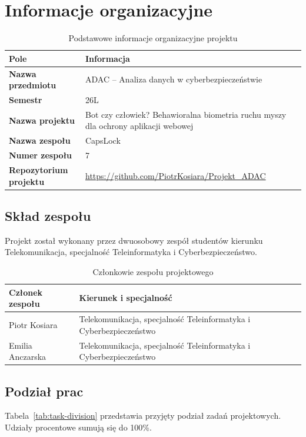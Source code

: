 \section{Informacje organizacyjne}

\begin{table}[H]
  \centering
  \begin{tabularx}{\textwidth}{>{\bfseries}p{} X}
    \toprule
    Pole & Informacja \\
    \midrule
    Nazwa przedmiotu & ADAC -- Analiza danych w cyberbezpieczeństwie \\
    Semestr & 26L \\
    Nazwa projektu & Bot czy człowiek? Behawioralna biometria ruchu myszy dla ochrony aplikacji webowej \\
    Nazwa zespołu & CapsLock \\
    Numer zespołu & 7 \\
    Repozytorium projektu & \url{https://github.com/PiotrKosiara/Projekt_ADAC} \\
    \bottomrule
  \end{tabularx}
  \caption{Podstawowe informacje organizacyjne projektu}
  \label{tab:organizational-info}
\end{table}

\subsection{Skład zespołu}
Projekt został wykonany przez dwuosobowy zespół studentów kierunku
Telekomunikacja, specjalność Teleinformatyka i Cyberbezpieczeństwo.

\begin{table}[H]
  \centering
  \begin{tabularx}{\textwidth}{p{} X}
    \toprule
    Członek zespołu & Kierunek i specjalność \\
    \midrule
    Piotr Kosiara & Telekomunikacja, specjalność Teleinformatyka i Cyberbezpieczeństwo \\
    Emilia Anczarska & Telekomunikacja, specjalność Teleinformatyka i Cyberbezpieczeństwo \\
    \bottomrule
  \end{tabularx}
  \caption{Członkowie zespołu projektowego}
  \label{tab:team-members}
\end{table}

\subsection{Podział prac}
Tabela~\ref{tab:task-division} przedstawia przyjęty podział zadań projektowych.
Udziały procentowe sumują się do 100\%.

